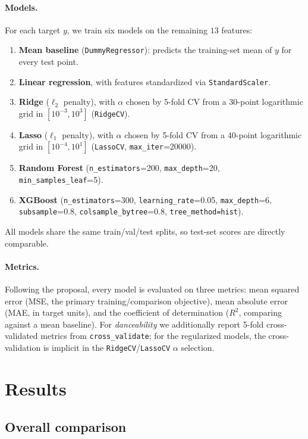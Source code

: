 \documentclass[11pt]{article}
\begin{document}
\paragraph{Models.} For each target $y$, we train six models on the remaining $13$ features:
\begin{enumerate}
    \item \textbf{Mean baseline} (\texttt{DummyRegressor}): predicts the training-set mean of $y$ for every test point.
    \item \textbf{Linear regression}, with features standardized via \texttt{StandardScaler}.
    \item \textbf{Ridge} ($\ell_2$ penalty), with $\alpha$ chosen by 5-fold CV from a 30-point logarithmic grid in $[10^{-3}, 10^{3}]$ (\texttt{RidgeCV}).
    \item \textbf{Lasso} ($\ell_1$ penalty), with $\alpha$ chosen by 5-fold CV from a 40-point logarithmic grid in $[10^{-4}, 10^{1}]$ (\texttt{LassoCV}, \texttt{max\_iter}=20000).
    \item \textbf{Random Forest} (\texttt{n\_estimators}=200, \texttt{max\_depth}=20, \texttt{min\_samples\_leaf}=5).
    \item \textbf{XGBoost} (\texttt{n\_estimators}=300, \texttt{learning\_rate}=0.05, \texttt{max\_depth}=6, \texttt{subsample}=0.8, \texttt{colsample\_bytree}=0.8, \texttt{tree\_method=hist}).
\end{enumerate}
All models share the same train/val/test splits, so test-set scores are directly comparable.

\paragraph{Metrics.} Following the proposal, every model is evaluated on three metrics: mean squared error (MSE, the primary training/comparison objective), mean absolute error (MAE, in target units), and the coefficient of determination ($R^2$, comparing against a mean baseline). For \emph{danceability} we additionally report 5-fold cross-validated metrics from \texttt{cross\_validate}; for the regularized models, the cross-validation is implicit in the \texttt{RidgeCV}/\texttt{LassoCV} $\alpha$ selection.

\section{Results}

\subsection{Overall comparison}
\end{document}
